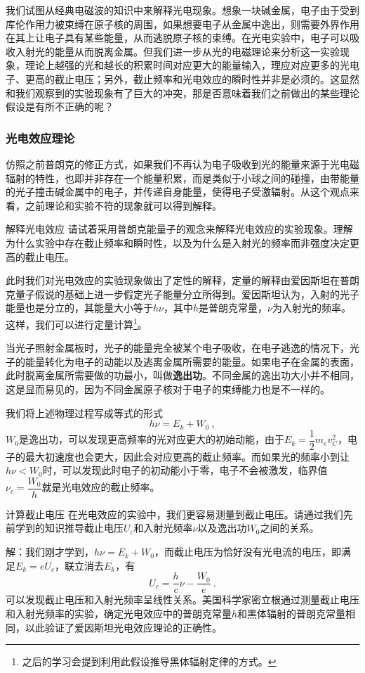 我们试图从经典电磁波的知识中来解释光电现象。想象一块碱金属，电子由于受到库伦作用力被束缚在原子核的周围，如果想要电子从金属中逸出，则需要外界作用在其上让电子具有某些能量，从而逃脱原子核的束缚。在光电实验中，电子可以吸收入射光的能量从而脱离金属。但我们进一步从光的电磁理论来分析这一实验现象，理论上越强的光和越长的积累时间对应更大的能量输入，理应对应更多的光电子、更高的截止电压；另外，截止频率和光电效应的瞬时性并非是必须的。这显然和我们观察到的实验现象有了巨大的冲突，那是否意味着我们之前做出的某些理论假设是有所不正确的呢？
\subsubsection{光电效应理论}
仿照之前普朗克的修正方式，如果我们不再认为电子吸收到光的能量来源于光电磁辐射的特性，也即并非存在一个能量积累，而是类似于小球之间的碰撞，由带能量的光子撞击碱金属中的电子，并传递自身能量，使得电子受激辐射。从这个观点来看，之前理论和实验不符的现象就可以得到解释。
\begin{exercise}{解释光电效应}
请试着采用普朗克能量子的观念来解释光电效应的实验现象。理解为什么实验中存在截止频率和瞬时性，以及为什么是入射光的频率而非强度决定更高的截止电压。
\end{exercise}
此时我们对光电效应的实验现象做出了定性的解释，定量的解释由爱因斯坦在普朗克量子假说的基础上进一步假定光子能量分立所得到。爱因斯坦认为，入射的光子能量也是分立的，其能量大小等于$h\nu$，其中$h$是普朗克常量，$\nu$为入射光的频率。这样，我们可以进行定量计算\footnote{之后的学习会提到利用此假设推导黑体辐射定律的方式。}。

当光子照射金属板时，光子的能量完全被某个电子吸收，在电子逃逸的情况下，光子的能量转化为电子的动能以及逃离金属所需要的能量。如果电子在金属的表面，此时脱离金属所需要做的功最小，叫做\textbf{逸出功}。不同金属的逸出功大小并不相同，这是显而易见的，因为不同金属原子核对于电子的束缚能力也是不一样的。

我们将上述物理过程写成等式的形式$$h\nu=E_k+W_0~,$$ $W_0$是逸出功，可以发现更高频率的光对应更大的初始动能，由于$E_k=\dfrac{1}{2}m_ev_C^2$，电子的最大初速度也会更大，因此会对应更高的截止频率。而如果光的频率小到让$h\nu<W_0$时，可以发现此时电子的初动能小于零，电子不会被激发，临界值$\nu_c=\dfrac{W_0}{h}$就是光电效应的截止频率。

\begin{example}{计算截止电压}
在光电效应的实验中，我们更容易测量到截止电压。请通过我们先前学到的知识推导截止电压$U_c$和入射光频率$\nu$以及逸出功$W_0$之间的关系。

解：我们刚才学到，$h\nu=E_k+W_0$，而截止电压为恰好没有光电流的电压，即满足$E_k=eU_c$，联立消去$E_k$，有
$$U_c=\dfrac{h}{c}\nu-\dfrac{W_0}{e}~.$$
可以发现截止电压和入射光频率呈线性关系。美国科学家密立根通过测量截止电压和入射光频率的实验，确定光电效应中的普朗克常量$h$和黑体辐射的普朗克常量相同，以此验证了爱因斯坦光电效应理论的正确性。
\end{example}

